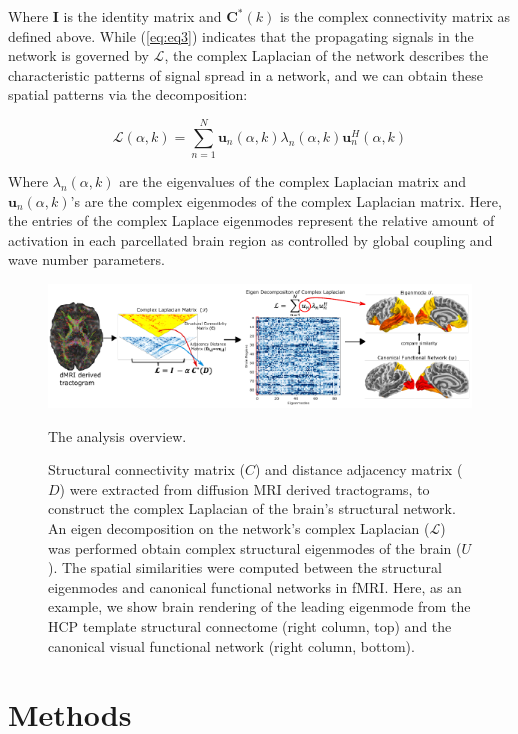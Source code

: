 Where $\pmb{I}$ is the identity matrix and $\pmb{C}^{*}(k)$ is the complex connectivity matrix as defined above. While (\ref{eq:eq3}) indicates that the propagating signals in the network is governed by $\mathcal{L}$, the complex Laplacian of the network describes the characteristic patterns of signal spread in a network, and we can obtain these spatial patterns via the decomposition:

\begin{equation}
\label{eq:eq8}
\bm{\mathcal{L}}(\alpha, k) = \sum_{n = 1}^{N} \bm{u}_{n}(\alpha, k)\lambda_{n}(\alpha, k)\bm{u}_{n}^{H}(\alpha, k)
\end{equation}

Where $\lambda_{n}(\alpha, k)$ are the eigenvalues of the complex Laplacian matrix and $\bm{u}_{n}(\alpha, k)$'s are the complex eigenmodes of the complex Laplacian matrix. Here, the entries of the complex Laplace eigenmodes represent the relative amount of activation in each parcellated brain region as controlled by global coupling and wave number parameters.

\begin{figure}[ht!]
  \centering
  \includegraphics[width=\textwidth]{../figures/chapter4/fig1_overview_v4.pdf}
  \caption{The analysis overview.}
  \caption*{Structural connectivity matrix ($C$) and distance adjacency matrix ($D$) were extracted from diffusion MRI derived tractograms, to construct the complex Laplacian of the brain's structural network. An eigen decomposition on the network's complex Laplacian ($\mathcal{L}$) was performed obtain complex structural eigenmodes of the brain ($U$). The spatial similarities were computed between the structural eigenmodes and canonical functional networks in fMRI. Here, as an example, we show brain rendering of the leading eigenmode from the HCP template structural connectome (right column, top) and the canonical visual functional network (right column, bottom).}
  \label{fig:fig1}
\end{figure}

\section{Methods}
